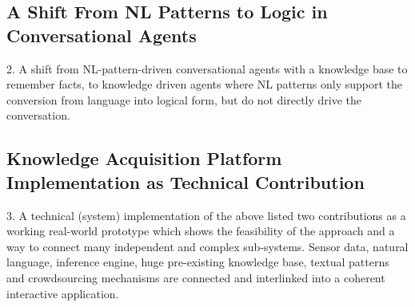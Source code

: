 \subsection{A Shift From NL Patterns to Logic in Conversational Agents}
2.	A shift from NL-pattern-driven conversational agents with a knowledge base to remember facts, to knowledge driven agents where NL patterns only support the conversion from language into logical form, but do not directly drive the conversation.

\subsection{Knowledge Acquisition Platform Implementation as Technical Contribution }
3.	A technical (system) implementation of the above listed two contributions as a working real-world prototype which shows the feasibility of the approach and a way to connect many independent and complex sub-systems. Sensor data, natural language, inference engine, huge pre-existing knowledge base, textual patterns and crowdsourcing mechanisms are connected and interlinked into a coherent interactive application.